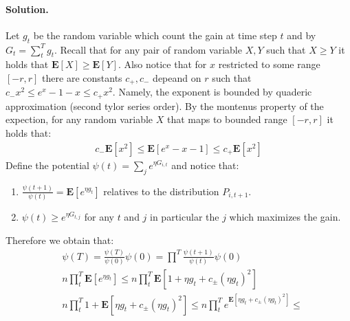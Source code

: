 \documentclass{article}
\newcommand{\expp}[1]{ \mathbf{E} \left[ {#1} \right]}
\begin{document}
\begin{multicols*}{2}
  \paragraph{Solution.}
  Let $g_{t}$ be the random variable which count the gain at time step $t$ and by $G_{t} = \sum_{t}^{T}{g_{t}}$. Recall that for any pair of random variable $X,Y$ such that $X \ge Y$ it holds that $\expp{X} \ge \expp{Y}$. Also notice that for $x$ restricted to some range $[-r,r]$ there are constants $c_{+}, c_{-}$ depeand on $r$ such that $c_{-}x^{2} \le e^{x} - 1 - x \le c_{+}x^{2}$. Namely, the exponent is bounded by quaderic approximation (second tylor series order). By the montenus property of the expection, for any random variable $X$ that maps to bounded range $[-r,r]$ it holds that:
  \begin{equation*}
    \begin{split}
      c_{-}\expp{x^{2}}\le \expp{e^{x} - x - 1} \le c_{+}\expp{x^{2}}
    \end{split}
  \end{equation*}
  Define the potential $\psi\left( t \right) =  \sum_{j}{ e^{\eta G_{i,t}}}$ and notice that:
    \begin{enumerate}
      \item $ \frac{\psi\left( t+1 \right)}{\psi\left( t \right)} = \expp{e^{\eta g_{t}}}$ relatives to the distribution $P_{i,t+1}$. 
      \item $ \psi\left( t \right) \ge e^{\eta G_{t,j}} $ for any $t$ and $j$ in particular the $j$ which maximizes the gain. 
    \end{enumerate}
Therefore we obtain that: 
\begin{equation*}
  \begin{split}
    & \psi\left( T \right) =  \frac{\psi\left( T \right)}{\psi\left( 0 \right)}\psi\left( 0 \right) = \prod^{T}{\frac{\psi\left( t+1 \right)}{\psi\left( t \right)} }\psi\left( 0 \right) \\
  & n \prod^{T}_{t}{\expp{ e^{\eta g_{t}} }}\le n \prod^{T}_{t}{\expp{ 1 + \eta g_{t} + c_{\pm}\left( \eta g_{t} \right)^{2} }} \\
& n \prod^{T}_{t}{ 1 + \expp{ \eta g_{t} + c_{\pm}\left( \eta g_{t} \right)^{2} }} \le  
 n \prod^{T}_{t}{ e^{\expp{ \eta g_{t} + c_{\pm}\left( \eta g_{t} \right)^{2} }}} \le \\ 

\end{split}
\end{equation*}
\end{multicols*}
\end{document}
